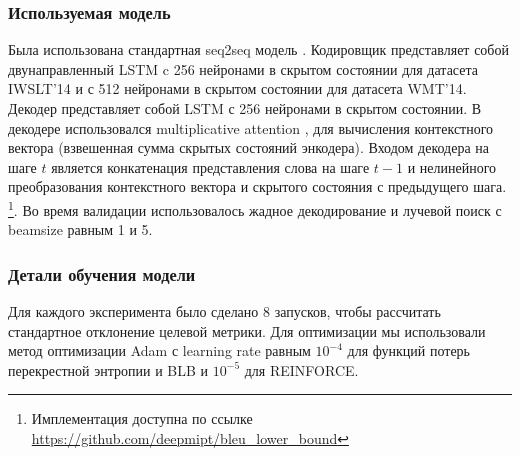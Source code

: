 \documentclass[14pt, a4paper]{extarticle}
\begin{document}
\subsubsection{Используемая модель}
Была использована стандартная seq2seq модель \cite{seq2seq}. 
Кодировщик представляет собой двунаправленный LSTM \cite{lstm} c 256 нейронами в скрытом состоянии для датасета IWSLT'14 и с 512 нейронами в скрытом состоянии для датасета WMT'14. 
Декодер представляет собой LSTM с 256 нейронами в скрытом состоянии. В декодере использовался multiplicative attention \cite{attn}, для вычисления контекстного вектора (взвешенная сумма скрытых состояний энкодера). 
Входом декодера на шаге $t$ является конкатенация представления слова на шаге $t-1$ и нелинейного преобразования контекстного вектора и скрытого состояния с предыдущего шага. 
\footnote{Имплементация доступна по ссылке \url{https://github.com/deepmipt/bleu_lower_bound}}. Во время валидации использовалось жадное декодирование и лучевой поиск с beamsize равным 1 и 5.

\subsubsection{Детали обучения модели}
Для каждого эксперимента было сделано 8 запусков, чтобы рассчитать стандартное отклонение целевой метрики. Для оптимизации мы использовали метод оптимизации Adam \cite{adam} с learning rate равным $10^{-4}$ для  функций потерь перекрестной энтропии и BLB и $10^{-5}$ для REINFORCE.
\end{document}
